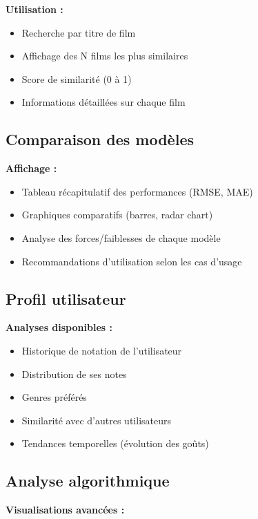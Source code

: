 \documentclass[12pt,a4paper]{article}
\begin{document}
\textbf{Utilisation :}
\begin{itemize}
    \item Recherche par titre de film
    \item Affichage des N films les plus similaires
    \item Score de similarité (0 à 1)
    \item Informations détaillées sur chaque film
\end{itemize}

\subsection{Comparaison des modèles}

\textbf{Affichage :}
\begin{itemize}
    \item Tableau récapitulatif des performances (RMSE, MAE)
    \item Graphiques comparatifs (barres, radar chart)
    \item Analyse des forces/faiblesses de chaque modèle
    \item Recommandations d'utilisation selon les cas d'usage
\end{itemize}

\subsection{Profil utilisateur}

\textbf{Analyses disponibles :}
\begin{itemize}
    \item Historique de notation de l'utilisateur
    \item Distribution de ses notes
    \item Genres préférés
    \item Similarité avec d'autres utilisateurs
    \item Tendances temporelles (évolution des goûts)
\end{itemize}

\subsection{Analyse algorithmique}

\textbf{Visualisations avancées :}
\end{document}
